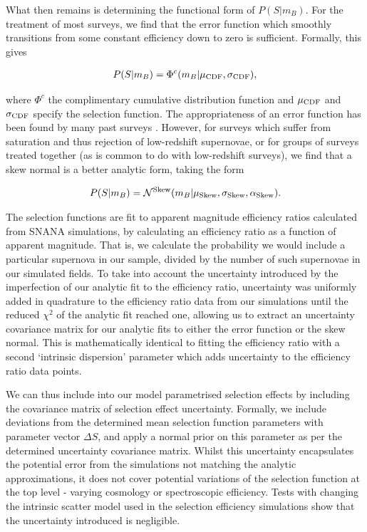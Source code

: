 \documentclass[a4paper,fleqn,usenatbib]{mnras}
\begin{document}
What then remains is determining the functional form of $P(S|m_B)$. For the treatment of most surveys, we find that the error function which smoothly transitions from some constant efficiency down to zero is sufficient. Formally, this gives

\begin{align}
P(S|m_B) = \Phi^c(m_B | \mu_{\rm CDF}, \sigma_{\rm CDF}),
\end{align}

where $\Phi^c$ the complimentary cumulative distribution function and $\mu_{\rm CDF}$ and $\sigma_{\rm CDF}$ specify the selection function. The appropriateness of an error function has been found by many past surveys \citep{Dilday2008, Barbary2010, Perrett2012, Graur2013, Rodney2014}. However, for surveys which suffer from saturation and thus rejection of low-redshift supernovae, or for groups of surveys treated together (as is common to do with low-redshift surveys), we find that a skew normal is a better analytic form, taking the form

\begin{align}
P(S|m_B) = \mathcal{N}^{{\rm Skew}}(m_B | \mu_{\rm Skew}, \sigma_{\rm Skew}, \alpha_{\rm Skew}).
\end{align}


The selection functions are fit to apparent magnitude efficiency ratios calculated from SNANA simulations, by calculating an efficiency ratio as a function of apparent magnitude. That is, we calculate the probability we would include a particular supernova in our sample, divided by the number of such supernovae in our simulated fields. To take into account the uncertainty introduced by the imperfection of our analytic fit to the efficiency ratio, uncertainty was uniformly added in quadrature to the efficiency ratio data from our simulations until the reduced $\chi^2$ of the analytic fit reached one, allowing us to extract an uncertainty covariance matrix for our analytic fits to either the error function or the skew normal. This is mathematically identical to fitting the efficiency ratio with a second `intrinsic dispersion' parameter which adds uncertainty to the efficiency ratio data points.

We can thus include into our model parametrised selection effects by including the covariance matrix of selection effect uncertainty. Formally, we include deviations from the determined mean selection function parameters with parameter vector $\Delta S$, and apply a normal prior on this parameter as per the determined uncertainty covariance matrix.  Whilst this uncertainty encapsulates the potential error from the simulations not matching the analytic approximations, it does not cover potential variations of the selection function at the top level - varying cosmology or spectroscopic efficiency. Tests with changing the intrinsic scatter model used in the selection efficiency simulations show that the uncertainty introduced is negligible.
\end{document}
